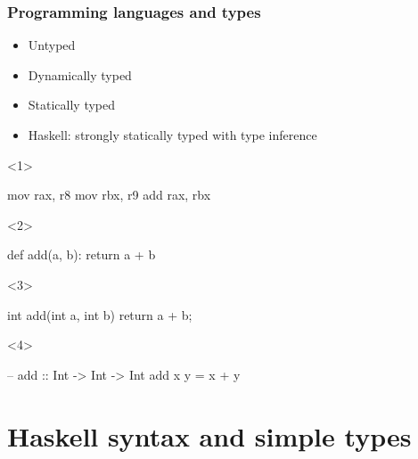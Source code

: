 \documentclass[17pt]{beamer}
\renewcommand{\(}[1]{\begin{columns}[#1]}
\renewcommand{\)}{\end{columns}}
\newcommand{\<}[1]{\begin{column}{#1}}
\renewcommand{\>}{\end{column}}
\begin{document}
\begin{frame}[fragile]
  \frametitle{Programming languages and types}
  \begin{minipage}[t][.3\textheight]{\textwidth}
    \begin{itemize}
      \item<1-> Untyped
      \item<2-> Dynamically typed
      \item<3-> Statically typed
      \item<4-> Haskell: strongly statically typed with type inference
    \end{itemize}
  \end{minipage}
  \begin{minipage}[c][.4\textheight]{\textwidth}
  \begin{center}
    \begin{onlyenv}<1>
      \begin{ccode}[asm]
mov rax, r8
mov rbx, r9
add rax, rbx
      \end{ccode}
    \end{onlyenv}
    \begin{onlyenv}<2>
      \begin{pycode}
def add(a, b):
  return a + b
      \end{pycode}
    \end{onlyenv}
    \begin{onlyenv}<3>
      \begin{ccode}
int add(int a, int b) {
  return a + b;
}
      \end{ccode}
    \end{onlyenv}
    \begin{onlyenv}<4>
      \begin{code}
-- add :: Int -> Int -> Int
add x y = x + y
      \end{code}
    \end{onlyenv}
  \end{center}
  \end{minipage}
\end{frame}

\section{Haskell syntax and simple types}
\end{document}

